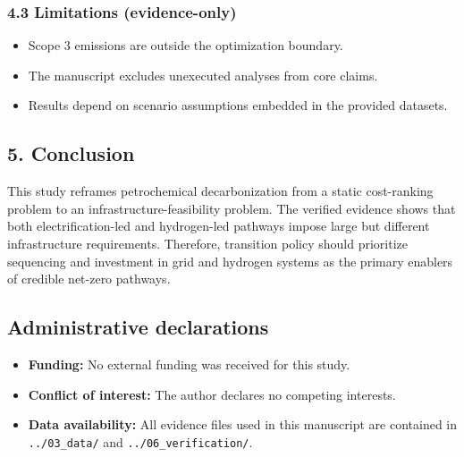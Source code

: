 \documentclass[
]{article}
\providecommand{\tightlist}{%
  \setlength{\itemsep}{0pt}\setlength{\parskip}{0pt}}
\begin{document}
\subsubsection{4.3 Limitations
(evidence-only)}\label{43-limitations-evidence-only}

\begin{itemize}
\tightlist
\item
  Scope 3 emissions are outside the optimization boundary.
\item
  The manuscript excludes unexecuted analyses from core claims.
\item
  Results depend on scenario assumptions embedded in the provided
  datasets.
\end{itemize}

\subsection{5. Conclusion}\label{5-conclusion}

This study reframes petrochemical decarbonization from a static
cost-ranking problem to an infrastructure-feasibility problem. The
verified evidence shows that both electrification-led and hydrogen-led
pathways impose large but different infrastructure requirements.
Therefore, transition policy should prioritize sequencing and investment
in grid and hydrogen systems as the primary enablers of credible
net-zero pathways.

\subsection{Administrative
declarations}\label{administrative-declarations}

\begin{itemize}
\tightlist
\item
  \textbf{Funding:} No external funding was received for this study.
\item
  \textbf{Conflict of interest:} The author declares no competing
  interests.
\item
  \textbf{Data availability:} All evidence files used in this manuscript
  are contained in \texttt{../03\_data/} and
  \texttt{../06\_verification/}.
\end{itemize}
\end{document}
